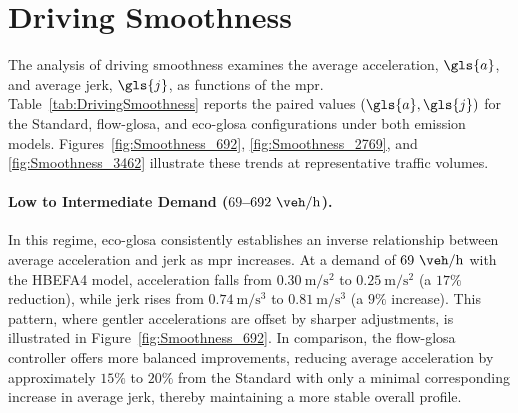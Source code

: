 \section{Driving Smoothness}
\label{sec:Results_Smoothness}

The analysis of driving smoothness examines the average acceleration, $\gls{a}$, and average jerk, $\gls{j}$, as functions of the \ac{mpr}. Table~\vref{tab:DrivingSmoothness} reports the paired values $(\gls{a}, \gls{j})$ for the Standard, \ac{flow-glosa}, and \ac{eco-glosa} configurations under both emission models. Figures~\vref{fig:Smoothness_692}, \vref{fig:Smoothness_2769}, and \vref{fig:Smoothness_3462} illustrate these trends at representative traffic volumes.

\paragraph{Low to Intermediate Demand ($69$--$692~\unit{\veh\per\hour}$).}
In this regime, \ac{eco-glosa} consistently establishes an inverse relationship between average acceleration and jerk as \ac{mpr} increases. At a demand of $69~\unit{\veh\per\hour}$ with the HBEFA4 model, acceleration falls from $0.30~\unit{\metre\per\second\squared}$ to $0.25~\unit{\metre\per\second\squared}$ (a $17\%$ reduction), while jerk rises from $0.74~\unit{\metre\per\second\cubed}$ to $0.81~\unit{\metre\per\second\cubed}$ (a $9\%$ increase). This pattern, where gentler accelerations are offset by sharper adjustments, is illustrated in Figure~\vref{fig:Smoothness_692}. In comparison, the \ac{flow-glosa} controller offers more balanced improvements, reducing average acceleration by approximately $15\%$ to $20\%$ from the Standard with only a minimal corresponding increase in average jerk, thereby maintaining a more stable overall profile.

